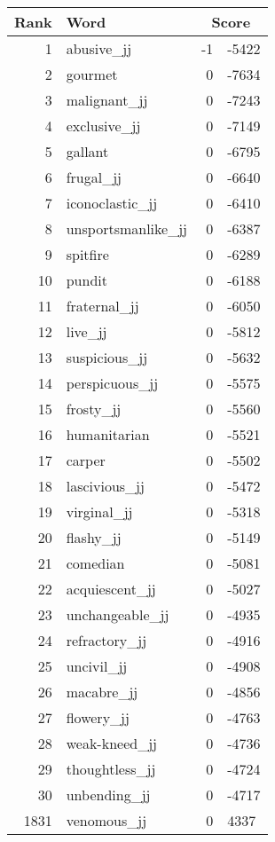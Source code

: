 \begin{longtable}[!htbp]{| rlr@{.}l |}
    \hline
    \textbf{Rank} & \textbf{Word} & \multicolumn{2}{c|}{\textbf{Score}} \\
    \hline
    \endhead
    1 & abusive\_jj & -1 & -5422 \\
    2 & gourmet & 0 & -7634 \\
    3 & malignant\_jj & 0 & -7243 \\
    4 & exclusive\_jj & 0 & -7149 \\
    5 & gallant & 0 & -6795 \\
    6 & frugal\_jj & 0 & -6640 \\
    7 & iconoclastic\_jj & 0 & -6410 \\
    8 & unsportsmanlike\_jj & 0 & -6387 \\
    9 & spitfire & 0 & -6289 \\
    10 & pundit & 0 & -6188 \\
    11 & fraternal\_jj & 0 & -6050 \\
    12 & live\_jj & 0 & -5812 \\
    13 & suspicious\_jj & 0 & -5632 \\
    14 & perspicuous\_jj & 0 & -5575 \\
    15 & frosty\_jj & 0 & -5560 \\
    16 & humanitarian & 0 & -5521 \\
    17 & carper & 0 & -5502 \\
    18 & lascivious\_jj & 0 & -5472 \\
    19 & virginal\_jj & 0 & -5318 \\
    20 & flashy\_jj & 0 & -5149 \\
    21 & comedian & 0 & -5081 \\
    22 & acquiescent\_jj & 0 & -5027 \\
    23 & unchangeable\_jj & 0 & -4935 \\
    24 & refractory\_jj & 0 & -4916 \\
    25 & uncivil\_jj & 0 & -4908 \\
    26 & macabre\_jj & 0 & -4856 \\
    27 & flowery\_jj & 0 & -4763 \\
    28 & weak-kneed\_jj & 0 & -4736 \\
    29 & thoughtless\_jj & 0 & -4724 \\
    30 & unbending\_jj & 0 & -4717 \\
    1831 & venomous\_jj & 0 & 4337 \\

\end{longtable}
